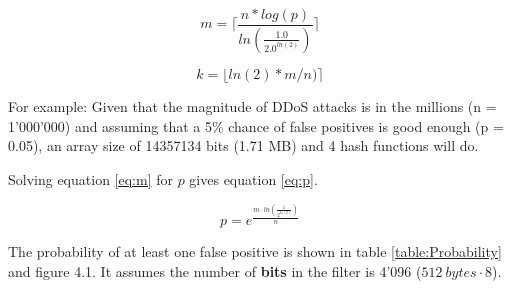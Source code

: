 \begin{equation}
m = \lceil\frac{n * log(p)}{ln(\frac{1.0}{2.0 ^{ln(2)}})}\rceil
\label{eq:m}
\end{equation}

\begin{equation}
k = \lfloor ln(2) * m / n) \rceil
\label{eq:k}
\end{equation}

For example: Given that the magnitude of DDoS attacks is in the millions (n = 1'000'000) and assuming that a 5\% chance of false positives is good enough (p = 0.05), an array size of 14357134 bits (1.71 MB) and 4 hash functions will do.

Solving equation \ref{eq:m} for $p$ gives equation \ref{eq:p}.

\begin{equation}
p = e^{\frac{{m \cdot ln(\frac{1}{2^{ln(2)}})}}{n}}
\label{eq:p}
\end{equation}

The probability of at least one false positive is shown in table \ref{table:Probability} and figure 4.1. It assumes the number of \textbf{bits} in the filter is 4'096 ($512\ bytes \cdot 8$).

